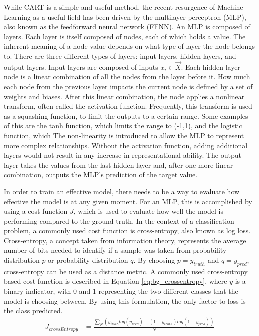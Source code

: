 	\par While CART is a simple and useful method, the recent resurgence of Machine Learning as a useful field has been driven by the multilayer perceptron (MLP), also known as the feedforward neural network (FFNN). An MLP is composed of layers. Each layer is itself composed of nodes, each of which holds a value. The inherent meaning of a node value depends on what type of layer the node belongs to. There are three different types of layers: input layers, hidden layers, and output layers. Input layers are composed of inputs $x_i \in \vec{X}$. Each hidden layer node is a linear combination of all the nodes from the layer before it. How much each node from the previous layer impacts the current node is defined by a set of weights and biases. After this linear combination, the node applies a nonlinear transform, often called the activation function. Frequently, this transform is used as a squashing function, to limit the outputs to a certain range. Some examples of this are the tanh function, which limits the range to (-1,1), and the logistic function, which  The non-linearity is introduced to allow the MLP to represent more complex relationships. Without the activation function, adding additional layers would not result in any increase in representational ability. The output layer takes the values from the last hidden layer and, after one more linear combination, outputs the MLP's prediction of the target value. 
	\par In order to train an effective model, there needs to be a way to evaluate how effective the model is at any given moment. For an MLP, this is accomplished by using a cost function $J$, which is used to evaluate how well the model is performing compared to the ground truth. In the context of a classification problem, a commonly used cost function is cross-entropy, also known as log loss. Cross-entropy, a concept taken from information theory, represents the average number of bits needed to identify if a sample was taken from probability distribution $p$ or probability distribution $q$. By choosing $p=y_{truth}$ and $q=y_{pred}$, cross-entropy can be used as a distance metric. A commonly used cross-entropy based cost function is described in Equation \ref{eq:bg_crossentropy}, where $y$ is a binary indicator, with 0 and 1 representing the two different classes that the model is choosing between. By using this formulation, the only factor to loss is the class predicted. 
	\begin{align}
		J_{crossEntropy} &= \frac{\sum_N (y_{truth}log(y_{pred}) + (1-y_{truth})log(1-y_{pred})) }{N} \label{eq:bg_crossentropy}
	\end{align}
